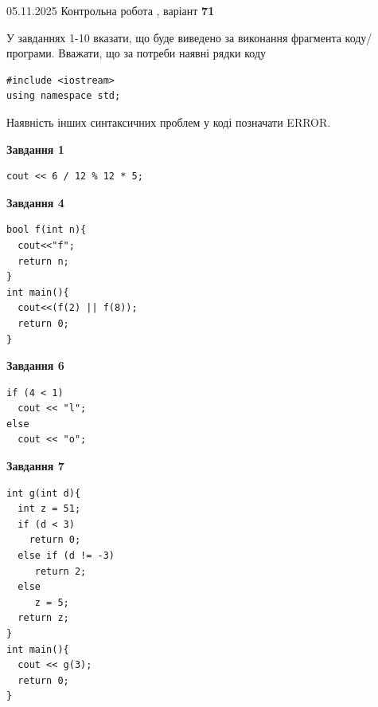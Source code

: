 \documentclass[12pt, ukrainian]{article}
\begin{document}
\newpage

{\Large{05.11.2025 Контрольна робота , варіант  \No \textbf { 71 }\par}}
{
\begin {large}
У завданнях 1-10 вказати, що буде виведено за виконання фрагмента коду/про\-гра\-ми.
Вважати, що за потреби наявні рядки коду
\begin{verbatim}
#include <iostream>
using namespace std;
\end{verbatim}
Наявність інших синтаксичних проблем у коді позначати ERROR.

\begin{minipage}[t]{7.0cm}

\begin{center}
\textbf{Завдання 1}
\end{center}
\vspace{-8mm}

\begin{verbatim}
cout << 6 / 12 % 12 * 5;
\end{verbatim}



\begin{center}
\textbf{Завдання 4}
\end{center}
\vspace{-8mm}

\begin{verbatim}
bool f(int n){
  cout<<"f";
  return n;
}
int main(){
  cout<<(f(2) || f(8));
  return 0;
}
\end{verbatim}



\begin{center}
\textbf{Завдання 6}
\end{center}
\vspace{-8mm}

\begin{verbatim}
if (4 < 1)
  cout << "l";
else
  cout << "o";
\end{verbatim}



\begin{center}
\textbf{Завдання 7}
\end{center}
\vspace{-8mm}

\begin{verbatim}
int g(int d){
  int z = 51;
  if (d < 3)
    return 0;
  else if (d != -3)
     return 2;
  else
     z = 5;
  return z;
}
int main(){
  cout << g(3);
  return 0;
}
\end{verbatim}


\end{minipage}
\end{large}}
\end{document}
